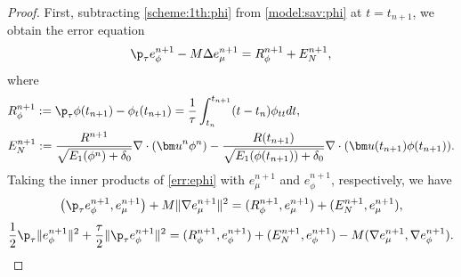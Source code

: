 \begin{proof} First, subtracting \eqref{scheme:1th:phi} from \eqref{model:sav:phi} at $t=t_{n+1}$, we obtain the error equation
	\begin{equation} \label{err:ephi}
		\p_\tau  e_\phi^{n+1}-M \Delta e_\mu^{n+1}=R_\phi^{n+1}+E_N^{n+1},
	\end{equation}
	where  
	\begin{equation*} 
		\begin{aligned}
			& R_\phi^{n+1}:=\p_\tau \phi(t_{n+1})- \phi_t(t_{n+1})=\frac{1}{\tau} \int_{t_n}^{t_{n+1}}(t-t_n) \phi_{tt} d t, \\
			& E_N^{n+1}:=\frac{R^{n+1}}{\sqrt{E_1(\phi^n)+\delta_0}} \nabla \cdot({\bm u}^n \phi^n) -\frac{R(t_{n+1})}{\sqrt{E_1(\phi(t_{n+1}))+\delta_0}}\nabla \cdot  (\bm u(t_{n+1})\phi(t_{n+1})).
		\end{aligned} 
	\end{equation*}
	Taking the inner products of \eqref{err:ephi} with $e_\mu^{n+1}$ and $e_\phi^{n+1}$, respectively, we have
	\begin{equation} \label{err:ephi:1}
		\big(\p_\tau  e_\phi^{n+1}, e_\mu^{n+1}\big)+M\|\nabla e_\mu^{n+1}\|^2= (R_\phi^{n+1}, e_\mu^{n+1})+(E_N^{n+1}, e_\mu^{n+1}),
	\end{equation}
	\begin{equation} \label{err:ephi:2}
		\frac{1}{2}\p_\tau \| e_\phi^{n+1}\|^2+ \frac{\tau}{2}\|\p_\tau  e_\phi^{n+1}\|^2=(R_\phi^{n+1}, e_\phi^{n+1})+(E_N^{n+1}, e_\phi^{n+1})-M(\nabla e_\mu^{n+1}, \nabla e_\phi^{n+1}).
	\end{equation}
	

\end{proof}
